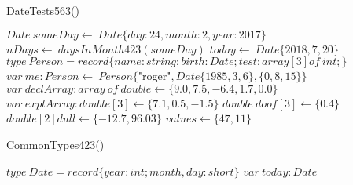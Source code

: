 \documentclass[a4paper,10pt]{article}
\begin{document}
\STATE {}


\begin{algorithm}
\caption{DateTests563()}
\begin{algorithmic}[5]

\STATE {}
  \STATE \(Date\ someDay\gets\ Date\{day:24,month:2,year:2017\}\)
  \STATE \(nDays\gets\ daysInMonth423(someDay)\)
  \STATE \(today\gets\ Date\{2018,7,20\}\)
  \STATE \(type\ Person=record\{name:string;birth:Date;test:array[3]of\ int;\}\)
  \STATE \(var\ me:Person\gets\ Person\{\)"{}roger"{}\(,Date\{1985,3,6\},\{0,8,15\}\}\)
  \STATE \(var\ declArray:array\ of\ double\gets\{9.0,7.5,-6.4,1.7,0.0\}\)
  \STATE \(var\ explArray:double[3]\gets\{7.1,0.5,-1.5\}\)
  \STATE \(double\ doof[3]\gets\{0.4\}\)
  \STATE \(double[2]dull\gets\{-12.7,96.03\}\)
  \STATE \(values\gets\{47,11\}\)

\end{algorithmic}
\end{algorithm}


\begin{algorithm}
\caption{CommonTypes423()}
\begin{algorithmic}[5]

\STATE {}
  \STATE \(type\ Date=record\{year:int;month,day:short\}\)
  \STATE \(var\ today:Date\)

\end{algorithmic}
\end{algorithm}
\end{document}
